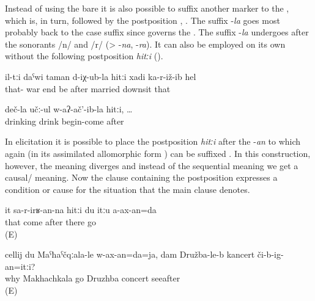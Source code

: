 Instead of using the bare  it is also possible to suffix another marker  to the , which is, in turn, followed by the postposition , . The suffix -\textit{la} goes most probably back to the  case suffix since  governs the . The suffix -\textit{la} undergoes  after the sonorants /n/ and /r/ (> -\textit{na}, -\textit{ra}). It can also be employed on its own without the following postposition \textit{hitːi} ().
%
\begin{exe}
	\ex	\label{ex:After the times of the war finished he married her}
	\gll	il-tːi	daˁwi	taman	d-iχ-ub-la	hitːi	xadi	ka-r-iž-ib	hel\\
		that-	war	end	be	after	married	downsit	that\\
	\glt	{}

	\ex	\label{ex:after he started drinking}
	\gll	deč-la	učː-ul	w-aʔ-ač'-ib-la	hitːi, \ldots\\
		drinking	drink	begin-come	after\\
	\glt	{}
\end{exe}

In elicitation it is possible to place the postposition \textit{hitːi} after the  -\textit{an} to which again  (in its assimilated allomorphic form ) can be suffixed . In this construction, however, the meaning diverges and instead of the sequential meaning we get a causal\slash {} meaning. Now the clause containing the postposition expresses a condition or cause for the situation that the main clause denotes.
%
\begin{exe}
	\ex	\label{ex:‎‎‎If / because she comes, I will not go there.}
	\gll	it	sa-r-irʁ-an-na	hitːi	du	itːu	a-ax-an=da\\
		that	come	after		there	go\\
	\glt	{} (E)

	\ex	\label{ex:Why should I go to Makhachkala, if / since I can will see the concert in Druzhba?}
	\gll	cellij	du	Maˁħaˁčqːala-le	w-ax-an=da=ja,	dam		Družba-le-b		kancert	či-b-ig-an=itːi?\\
		why		Makhachkala	go		Druzhba	concert	seeafter\\
	\glt	{} (E)
\end{exe}


